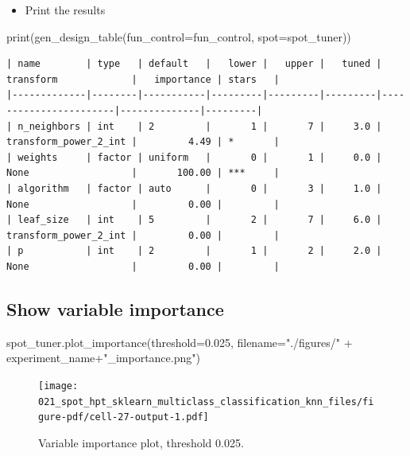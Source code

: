 \documentclass[
  letterpaper,
  DIV=11,
  numbers=noendperiod]{scrreprt}
\newenvironment{Shaded}{\begin{snugshade}}{\end{snugshade}}
\newcommand{\BuiltInTok}[1]{\textcolor[rgb]{0.00,0.23,0.31}{#1}}
\newcommand{\FloatTok}[1]{\textcolor[rgb]{0.68,0.00,0.00}{#1}}
\newcommand{\NormalTok}[1]{\textcolor[rgb]{0.00,0.23,0.31}{#1}}
\newcommand{\OperatorTok}[1]{\textcolor[rgb]{0.37,0.37,0.37}{#1}}
\newcommand{\StringTok}[1]{\textcolor[rgb]{0.13,0.47,0.30}{#1}}
\providecommand{\tightlist}{%
  \setlength{\itemsep}{0pt}\setlength{\parskip}{0pt}}\usepackage{longtable,booktabs,array}
\begin{document}
\begin{itemize}
\tightlist
\item
  Print the results
\end{itemize}

\begin{Shaded}
\begin{Highlighting}[]
\BuiltInTok{print}\NormalTok{(gen\_design\_table(fun\_control}\OperatorTok{=}\NormalTok{fun\_control,}
\NormalTok{    spot}\OperatorTok{=}\NormalTok{spot\_tuner))}
\end{Highlighting}
\end{Shaded}

\begin{verbatim}
| name        | type   | default   |   lower |   upper |   tuned | transform             |   importance | stars   |
|-------------|--------|-----------|---------|---------|---------|-----------------------|--------------|---------|
| n_neighbors | int    | 2         |       1 |       7 |     3.0 | transform_power_2_int |         4.49 | *       |
| weights     | factor | uniform   |       0 |       1 |     0.0 | None                  |       100.00 | ***     |
| algorithm   | factor | auto      |       0 |       3 |     1.0 | None                  |         0.00 |         |
| leaf_size   | int    | 5         |       2 |       7 |     6.0 | transform_power_2_int |         0.00 |         |
| p           | int    | 2         |       1 |       2 |     2.0 | None                  |         0.00 |         |
\end{verbatim}

\hypertarget{show-variable-importance-4}{%
\subsection{Show variable importance}\label{show-variable-importance-4}}

\begin{Shaded}
\begin{Highlighting}[]
\NormalTok{spot\_tuner.plot\_importance(threshold}\OperatorTok{=}\FloatTok{0.025}\NormalTok{, filename}\OperatorTok{=}\StringTok{"./figures/"} \OperatorTok{+}\NormalTok{ experiment\_name}\OperatorTok{+}\StringTok{"\_importance.png"}\NormalTok{)}
\end{Highlighting}
\end{Shaded}

\begin{figure}[H]

{\centering \texttt{[image: 021\_spot\_hpt\_sklearn\_multiclass\_classification\_knn\_files/figure-pdf/cell-27-output-1.pdf]}

}

\caption{Variable importance plot, threshold 0.025.}

\end{figure}
\end{document}
